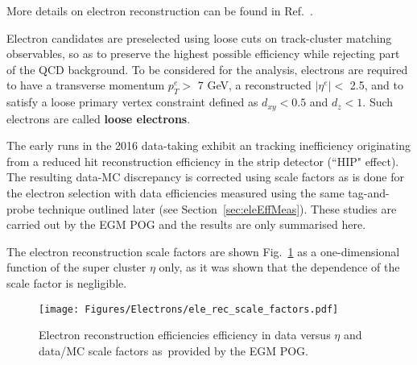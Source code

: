 More details on electron reconstruction can be found in Ref.~\cite{ElectronLegacy}. 

Electron candidates are preselected using loose cuts on track-cluster matching observables, so as to preserve the highest possible efficiency while rejecting part of the QCD background. To be considered for the analysis, electrons are required to have a
transverse momentum $p^e_T >$ 7 GeV, a reconstructed $|\eta^e| <$ 2.5, and to satisfy a loose primary vertex 
constraint defined as $d_{xy} < 0.5$ and $d_z < 1$. 
Such electrons are called {\bf loose electrons}.

The early runs in the 2016 data-taking exhibit an tracking inefficiency originating from a reduced hit reconstruction efficiency in the strip detector (``HIP" effect). 
The resulting data-MC discrepancy is corrected using scale factors as is done for the electron selection with data efficiencies measured using the same tag-and-probe technique outlined later (see Section~\ref{sec:eleEffMeas}). 
These studies are carried out by the EGM POG and the results are only summarised here.

The electron reconstruction scale factors are shown Fig.~\ref{fig:ele_rec_scale_factors} as a one-dimensional function of the super cluster $\eta$ only, as it was shown that the \pt dependence of the scale factor is negligible.

\begin{figure}[!htb]
\vspace*{0.3cm}
\begin{center}
\texttt{[image: Figures/Electrons/ele\_rec\_scale\_factors.pdf]}
\end{center}
\caption{Electron reconstruction efficiencies efficiency in data versus $\eta$ and data/MC scale factors as provided by the EGM POG.}
\label{fig:ele_rec_scale_factors}
\end{figure}
